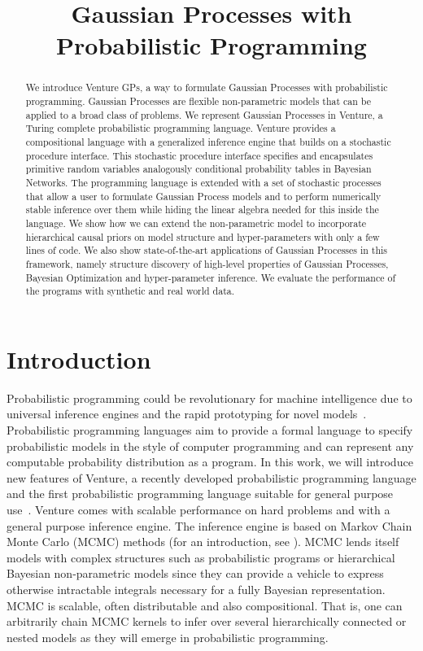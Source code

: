 \documentclass{article} %
\title{Gaussian Processes with Probabilistic Programming}
\author{
}
\begin{document}
\maketitle

\begin{abstract}
We introduce Venture GPs, a way to formulate Gaussian Processes with probabilistic programming. Gaussian Processes are flexible non-parametric models that can be applied to a broad class of problems.
We represent Gaussian Processes in Venture, a Turing complete probabilistic programming language. Venture provides a compositional language with a generalized inference engine that builds on a stochastic procedure interface. This stochastic procedure interface specifies and encapsulates primitive random variables analogously conditional probability tables in Bayesian Networks. The programming language is extended with a set of stochastic processes that allow a user to formulate Gaussian Process models and to perform numerically stable inference over them while hiding the linear algebra needed for this inside the language. We show how we can extend the non-parametric model to incorporate hierarchical causal priors on model structure and hyper-parameters with only a few lines of code. We also show state-of-the-art applications of Gaussian Processes in this framework, namely structure discovery of high-level properties of Gaussian Processes, Bayesian Optimization and hyper-parameter inference. 
We evaluate the performance of the programs with synthetic and real world data. 
\end{abstract}
\section{Introduction}
Probabilistic programming could be revolutionary for machine intelligence due to universal inference engines and the rapid prototyping for novel models~\citep{ghahramani2015probabilistic}. Probabilistic programming languages aim to provide a formal language to specify probabilistic models in the style of computer programming and can represent any computable probability distribution as a program. In this work, we will introduce new features of Venture, a recently developed probabilistic programming language and the first probabilistic programming language suitable for general purpose use~\citep{mansinghka2014venture}. Venture comes with scalable performance on hard problems and with a general purpose inference engine. The inference engine is based on Markov Chain Monte Carlo (MCMC) methods (for an introduction, see \citet*{andrieu2003introduction}). MCMC lends itself models with complex structures such as probabilistic programs or hierarchical Bayesian non-parametric models since they can provide a vehicle to express otherwise intractable integrals necessary for a fully Bayesian representation. MCMC is scalable, often distributable and also compositional. That is, one can arbitrarily chain MCMC kernels to infer over several hierarchically connected or nested models as they will emerge in probabilistic programming.
\end{document}

